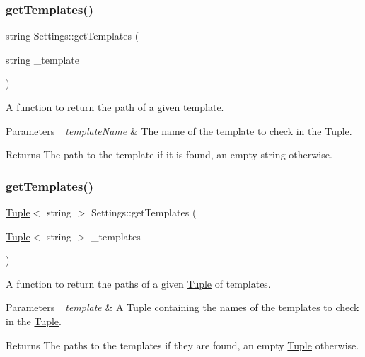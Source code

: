 \subsubsection{\texorpdfstring{getTemplates()}{getTemplates()}\hspace{0.1cm}{\footnotesize\ttfamily [2/3]}}
{\footnotesize\ttfamily string Settings\+::get\+Templates (\begin{DoxyParamCaption}\item[{string}]{\+\_\+template }\end{DoxyParamCaption})}



A function to return the path of a given template. 


\begin{DoxyParams}{Parameters}
{\em \+\_\+template\+Name} & The name of the template to check in the \mbox{\hyperlink{class_tuple}{Tuple}}. \\
\hline
\end{DoxyParams}
\begin{DoxyReturn}{Returns}
The path to the template if it is found, an empty string otherwise. 
\end{DoxyReturn}
\mbox{\label{class_settings_a2fe58de6135c30ec02bccfc20cc15fe3}} 
\subsubsection{\texorpdfstring{getTemplates()}{getTemplates()}\hspace{0.1cm}{\footnotesize\ttfamily [3/3]}}
{\footnotesize\ttfamily \mbox{\hyperlink{class_tuple}{Tuple}}$<$ string $>$ Settings\+::get\+Templates (\begin{DoxyParamCaption}\item[{\mbox{\hyperlink{class_tuple}{Tuple}}$<$ string $>$}]{\+\_\+templates }\end{DoxyParamCaption})}



A function to return the paths of a given \mbox{\hyperlink{class_tuple}{Tuple}} of templates. 


\begin{DoxyParams}{Parameters}
{\em \+\_\+template} & A \mbox{\hyperlink{class_tuple}{Tuple}} containing the names of the templates to check in the \mbox{\hyperlink{class_tuple}{Tuple}}. \\
\hline
\end{DoxyParams}
\begin{DoxyReturn}{Returns}
The paths to the templates if they are found, an empty \mbox{\hyperlink{class_tuple}{Tuple}} otherwise. 
\end{DoxyReturn}
\mbox{\label{class_settings_aa924e455cc6ac356ba6a4c59ab09591c}} 
